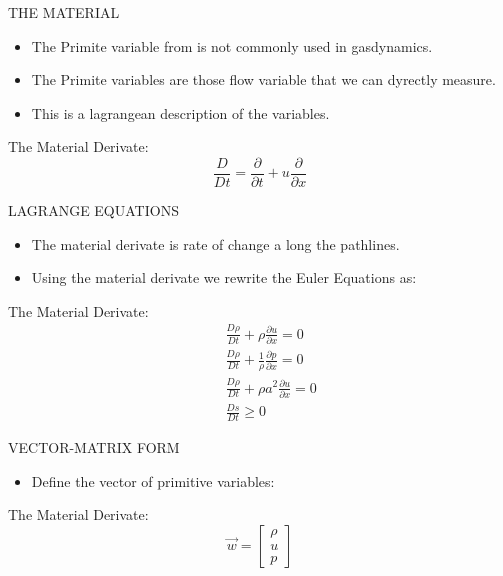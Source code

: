 \documentclass{beamer}
\begin{document}
\begin{frame}{THE MATERIAL}
  \begin{itemize}
   \item The Primite variable from is not commonly used in gasdynamics. 
   \item The Primite variables are those flow variable that we can dyrectly measure.
   \item This is a lagrangean description of the variables.
  \end{itemize}
The Material Derivate:
  \begin{equation}
   \frac{D}{Dt}=\frac{\partial}{\partial{t}}+u\frac{\partial}{\partial{x}}
  \end{equation}
\end{frame}

\begin{frame}{LAGRANGE EQUATIONS}
  \begin{itemize}
   \item The material derivate is rate of change a long the pathlines.
   \item Using the material derivate we rewrite the Euler Equations as:
  \end{itemize}
The Material Derivate:
  \begin{eqnarray}
    &&\frac{D\rho}{Dt}+\rho\frac{\partial{u}}{\partial{x}}=0 \\
    &&\frac{D\rho}{Dt}+\frac{1}{\rho}\frac{\partial{p}}{\partial{x}}=0 \\
    &&\frac{D\rho}{Dt}+{\rho}a^2\frac{\partial{u}}{\partial{x}}=0 \\
    &&\frac{Ds}{Dt}\geq 0
  \end{eqnarray}
\end{frame}

\begin{frame}{VECTOR-MATRIX FORM}
  \begin{itemize}
   \item Define the vector of primitive variables:
  \end{itemize}
The Material Derivate:
  \begin{equation}
   \vec{w}=\begin{bmatrix}
   \rho\\ 
   u\\ 
   p
   \end{bmatrix}
  \end{equation}
\end{frame}
\end{document}
